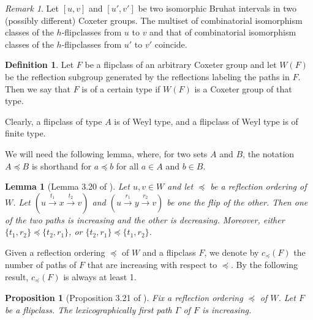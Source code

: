 \documentclass[12pt,reqno]{amsart}
\theoremstyle{plain}
\newtheorem{pro}[thm]{Proposition}
\newtheorem{lem}[thm]{Lemma}
\theoremstyle{definition}
\newtheorem{defn}[thm]{Definition}
\theoremstyle{remark}
\newtheorem{rmk}[thm]{Remark}
\begin{document}
\begin{rmk}
\label{costante}
Let $[u,v]$ and $[u',v']$ be two isomorphic Bruhat intervals in two (possibly different) Coxeter groups. The multiset of combinatorial isomorphism classes of the $h$-flipclasses from $u$ to $v$ and that  of combinatorial isomorphism classes of the $h$-flipclasses from $u'$ to $v'$ coincide.
\end{rmk}

\begin{defn}
\label{deffin}
Let $F$ be a flipclass of an arbitrary Coxeter group and let $W(F)$ be the reflection subgroup generated by the reflections labeling the paths in $F$. Then we say that $F$ is of a certain type if $W(F)$ is a Coxeter group of that type.
\end{defn}
Clearly, a flipclass of type $A$ is of Weyl type, and a flipclass of Weyl type is of finite type.

We will need the following lemma, where, for two sets $A$ and $B$, the notation $A\preceq B$ is shorthand for $a\preceq b$ for all $a\in A$ and $b\in B$.
\begin{lem}[Lemma 3.20 of \cite{EMS}]
\label{espomariancona24}
Let $u,v \in W$ and let $\preceq$ be a reflection ordering of $W$. Let $(u  \stackrel{t_1} {\longrightarrow} x  \stackrel{t_2}{\longrightarrow} v)$ and $(u \stackrel{r_1}{\longrightarrow} y  \stackrel{r_2}{\longrightarrow} v)$ be one the flip of the other. Then one of the two  paths is increasing and the other is decreasing. Moreover, either $\{t_1,r_2\} \preceq \{t_2,r_1\}$, or  $\{t_2,r_1\} \preceq \{t_1,r_2\}$. 
\end{lem}

Given a reflection ordering $\preceq$  of $W$ and a flipclass $F$, we denote by $c_{\preceq}(F)$ the number of paths of $F$ that are increasing with respect to $\preceq$. By the following result, $c_{\preceq}(F)$ is always at least 1.
\begin{pro}[Proposition 3.21 of \cite{EMS}]
\label{greedy}
Fix a reflection ordering   $\preceq$ of $W$. Let $F$ be a flipclass. The  lexicographically first path $\Gamma$ of $F$ is increasing. 
\end{pro}
\end{document}

